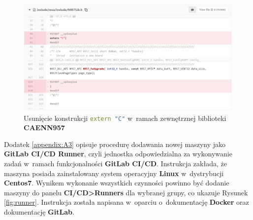 \begin{figure}
\includegraphics[width=\textwidth]{res/png/removeExternC}
\caption{Usunięcie konstrukcji \lstinline[language=c++]{extern "C"} w~ramach zewnętrznej biblioteki \textbf{CAENN957}}
\label{fig:removeExternC}
\end{figure}

\onecolumn




\newpage





Dodatek \ref{appendix:A3} opisuje procedurę dodawania nowej maszyny jako \textbf{GitLab CI/CD Runner}, czyli jednostka odpowiedzialna za wykonywanie zadań w~ramach funkcjonalności \textbf{GitLab CI/CD}. Instrukcja zakłada, że maszyna posiada zainstalowany system operacyjny \textbf{Linux} w~dystrybucji \textbf{Centos7}. Wynikem wykonanie wszystkich czynności powinno być dodanie maszyny do panelu \textbf{CI/CD>Runners} dla wybranej grupy, co ukazuje Rysunek \ref{fig:runner}. Instrukcja została napisana w~oparciu o~dokumentację \textbf{Docker}\cite{DockerInstall} oraz dokumentację \textbf{GitLab}\cite{RunnerRegister}.

